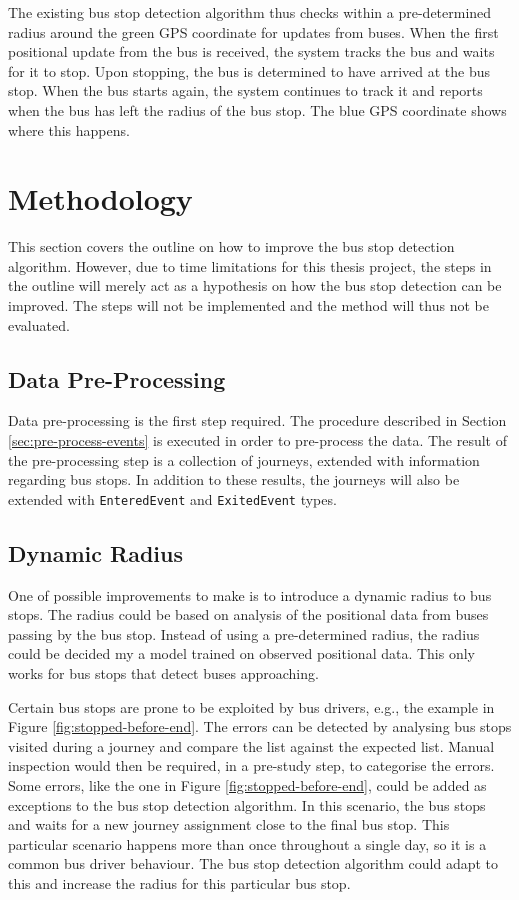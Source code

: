 The existing bus stop detection algorithm thus checks within a pre-determined radius around the green GPS coordinate for updates from buses.
When the first positional update from the bus is received, the system tracks the bus and waits for it to stop.
Upon stopping, the bus is determined to have arrived at the bus stop.
When the bus starts again, the system continues to track it and reports when the bus has left the radius of the bus stop.
The blue GPS coordinate shows where this happens.

\section{Methodology}
This section covers the outline on how to improve the bus stop detection algorithm.
However, due to time limitations for this thesis project, the steps in the outline will merely act as a hypothesis on how the bus stop detection can be improved.
The steps will not be implemented and the method will thus not be evaluated.

\subsection{Data Pre-Processing}
Data pre-processing is the first step required.
The procedure described in Section \ref{sec:pre-process-events} is executed in order to pre-process the data.
The result of the pre-processing step is a collection of journeys, extended with information regarding bus stops.
In addition to these results, the journeys will also be extended with \texttt{EnteredEvent} and \texttt{ExitedEvent} types.

\subsection{Dynamic Radius}
One of possible improvements to make is to introduce a dynamic radius to bus stops.
The radius could be based on analysis of the positional data from buses passing by the bus stop.
Instead of using a pre-determined radius, the radius could be decided my a model trained on observed positional data.
This only works for bus stops that detect buses approaching.

Certain bus stops are prone to be exploited by bus drivers, e.g., the example in Figure \ref{fig:stopped-before-end}.
The errors can be detected by analysing bus stops visited during a journey and compare the list against the expected list.
Manual inspection would then be required, in a pre-study step, to categorise the errors.
Some errors, like the one in Figure \ref{fig:stopped-before-end}, could be added as exceptions to the bus stop detection algorithm.
In this scenario, the bus stops and waits for a new journey assignment close to the final bus stop.
This particular scenario happens more than once throughout a single day, so it is a common bus driver behaviour.
The bus stop detection algorithm could adapt to this and increase the radius for this particular bus stop.

